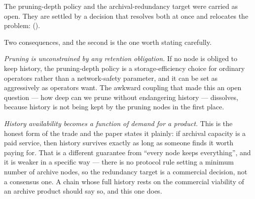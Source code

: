 \begin{remark}
\label{rem:archive-product}
The pruning-depth policy and the archival-redundancy target were carried as open. They are settled by
a decision that resolves both at once and relocates the problem:   (\planned).

Two consequences, and the second is the one worth stating carefully.

\emph{Pruning is unconstrained by any retention obligation.} If no node is obliged to keep history,
the pruning-depth policy is a storage-efficiency choice for ordinary operators rather than a
network-safety parameter, and it can be set as aggressively as operators want. The awkward coupling
that made this an open question --- how deep can we prune without endangering history --- dissolves,
because history is not being kept by the pruning nodes in the first place.

\emph{History availability becomes a function of demand for a product.} This is the honest form of
the trade and the paper states it plainly: if archival capacity is a paid service, then history
survives exactly as long as someone finds it worth paying for. That is a different guarantee from
``every node keeps everything'', and it is weaker in a specific way --- there is no protocol rule
setting a minimum number of archive nodes, so the redundancy target is a commercial decision, not a
consensus one. A chain whose full history rests on the commercial viability of an archive product
should say so, and this one does.
\end{remark}

